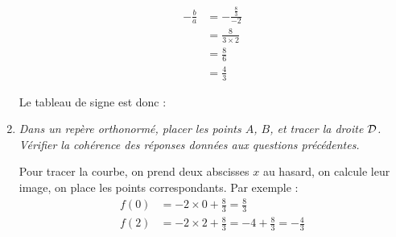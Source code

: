 \documentclass[12pt]{article}
\begin{document}
\begin{exercice}
\begin{enumerate}
\begin{multicols}{2}
      \columnbreak

      \begin{align*}
      -\frac{b}{a} &= -\frac{\frac{8}{3}}{-2} \\
       &= \frac{8}{3\times2} \\
       &= \frac{8}{6} \\
       &= \frac{4}{3}
    \end{align*}
  \end{multicols}

    Le tableau de signe est donc :

      \begin{center}
      \end{center}

    \item \emph{Dans un repère orthonormé, placer les points $A$, $B$, et tracer la droite $\cal D$. Vérifier la cohérence des réponses données aux questions précédentes.}

      Pour tracer la courbe, on prend deux abscisses $x$ au hasard, on calcule leur image, on place les points correspondants. Par exemple :
      \begin{align*}
        f(0) &= -2\times 0+\frac{8}{3} =\frac{8}{3} \\
        f(2) &= -2\times 2+\frac{8}{3} =-4+\frac{8}{3}=-\frac{4}{3}
      \end{align*}

      \pagebreak

      \begin{multicols}{2}
\end{multicols}
\end{enumerate}
\end{exercice}
\end{document}

